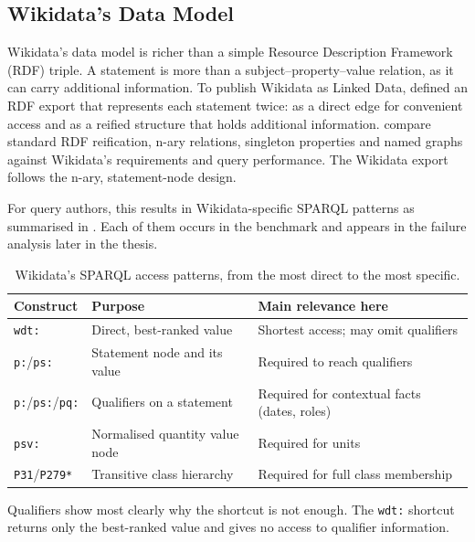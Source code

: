 \subsection{Wikidata's Data Model}

\label{sec:wikidata-model}

Wikidata’s data model is richer than a simple Resource Description Framework (RDF) triple. A statement is more than a subject–property–value relation, as it can carry additional information. To publish Wikidata as Linked Data, \citet{erxleben2014introducing} defined an RDF export that represents each statement twice: as a direct edge for convenient access and as a reified structure that holds additional information.
\citet{hernandez2015reifying} compare standard RDF reification, n-ary relations, singleton properties and named graphs against Wikidata's requirements and query performance.
The Wikidata export follows the n-ary, statement-node design.

For query authors, this results in Wikidata-specific SPARQL patterns as summarised in
. Each of them occurs in the benchmark and appears in the failure analysis later in the thesis.

\begin{table}[htbp]
\centering
\small
\caption{Wikidata's SPARQL access patterns, from the most direct to the most specific.}
\label{tab:sparql-constructs}
\begin{tabular}{@{}lll@{}}
\toprule
Construct & Purpose & Main relevance here \\
\midrule
\texttt{wdt:} & Direct, best-ranked value & Shortest access; may omit qualifiers \\
\texttt{p:}/\texttt{ps:} & Statement node and its value & Required to reach qualifiers \\
\texttt{p:}/\texttt{ps:}/\texttt{pq:} & Qualifiers on a statement & Required for contextual facts (dates, roles) \\
\texttt{psv:} & Normalised quantity value node & Required for units \\
\texttt{P31}/\texttt{P279*} & Transitive class hierarchy & Required for full class membership \\
\bottomrule
\end{tabular}
\end{table}

Qualifiers show most clearly why the shortcut is not enough.
The \texttt{wdt:} shortcut returns only the best-ranked value and gives no access to qualifier information.

